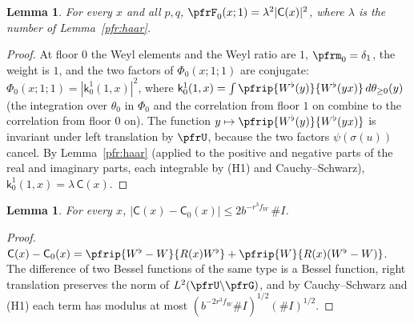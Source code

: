 \documentclass[10pt]{amsart}
\newtheorem{lemma}[theorem]{Lemma}
\theoremstyle{definition}
\theoremstyle{remark}
\begin{document}
\begin{lemma}\label{pfr:F0}
For every $x$ and all $p,q$, $\pfrF_0(x;1)=\lambda^2|\mathsf C(x)|^2$, where $\lambda$ is the number of
Lemma~\ref{pfr:haar}.
\end{lemma}
\begin{proof}
At floor $0$ the Weyl elements and the Weyl ratio are $1$, $\pfrm_0=\delta_1$, the weight is $1$, and the
two factors of $\Phi_0(x;1;1)$ are conjugate: $\Phi_0(x;1;1)=|\mathsf k^1_0(1,x)|^2$, where $\mathsf
k^1_0(1,x)=\int\pfrip{W^\flat(y)}{W^\flat(yx)}\,d\theta_{\ge0}(y)$ (the integration over $\theta_0$ in $\Phi_0$ and
the correlation from floor $1$ on combine to the correlation from floor $0$ on). The function
$y\mapsto\pfrip{W^\flat(y)}{W^\flat(yx)}$ is invariant under left translation by $\pfrU$, because the two
factors $\psi(\sigma(u))$ cancel. By Lemma~\ref{pfr:haar} (applied to the positive and negative parts of
the real and imaginary parts, each integrable by (H1) and Cauchy--Schwarz), $\mathsf k^1_0(1,x)=\lambda\,
\mathsf C(x)$.
\end{proof}

\begin{lemma}\label{pfr:coeffdiff}
For every $x$, $|\mathsf C(x)-\mathsf C_0(x)|\le2b^{-r^3f_W}\,\#I$.
\end{lemma}
\begin{proof}
$\mathsf C(x)-\mathsf C_0(x)=\pfrip{W^\flat-W}{R(x)W^\flat}+\pfrip{W}{R(x)(W^\flat-W)}$. The difference of two
Bessel functions of the same type is a Bessel function, right translation preserves the norm of
$L^2(\pfrU\backslash\pfrG)$, and by Cauchy--Schwarz and (H1) each term has modulus at most
$(b^{-2r^3f_W}\#I)^{1/2}(\#I)^{1/2}$.
\end{proof}
\end{document}
